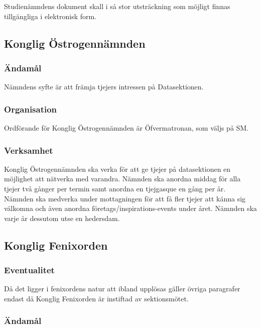 \documentclass[a4paper,12pt]{article}
\begin{document}
Studienämndens dokument skall i så stor utsträckning som möjligt finnas tillgängliga i elektronisk form.

\subsection{Konglig Östrogennämnden}

\subsubsection{Ändamål}

Nämndens syfte är att främja tjejers intressen på Datasektionen.

\subsubsection{Organisation}

Ordförande för Konglig Östrogennämnden är Öfvermatronan, som väljs på SM.

\subsubsection{Verksamhet}

Konglig Östrogennämnden ska verka för att ge tjejer på datasektionen en möjlighet att
nätverka med varandra. Nämnden ska anordna middag för alla tjejer två gånger per
termin samt anordna en tjejgasque en gång per år. Nämnden ska medverka under
mottagningen för att få fler tjejer att känna sig välkomna och även anordna
företags/inspirations-events under året. Nämnden ska varje år dessutom utse en
hedersdam.

\subsection{Konglig Fenixorden}

\subsubsection{Eventualitet}

Då det ligger i fenixordens natur att ibland upplösas gäller övriga paragrafer endast då Konglig Fenixorden är instiftad av sektionsmötet.

\subsubsection{Ändamål}
\end{document}
